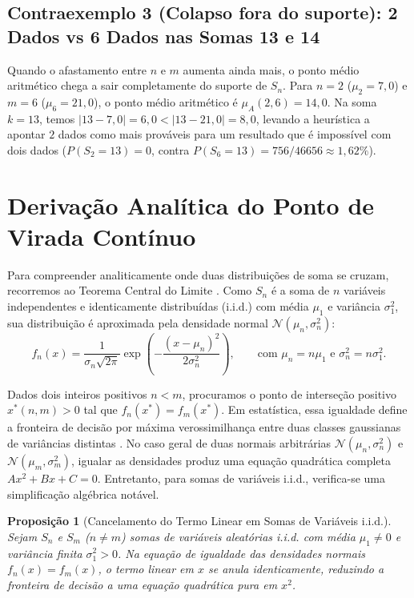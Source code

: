 \documentclass[11pt,a4paper]{article}
\newtheorem{proposition}[theorem]{Proposição}
\theoremstyle{definition}
\theoremstyle{remark}
\begin{document}
\subsection{Contraexemplo 3 (Colapso fora do suporte): 2 Dados vs 6 Dados nas Somas 13 e 14}

Quando o afastamento entre $n$ e $m$ aumenta ainda mais, o ponto médio aritmético chega a sair completamente do suporte de $S_n$. Para $n = 2$ ($\mu_2 = 7{,}0$) e $m = 6$ ($\mu_6 = 21{,}0$), o ponto médio aritmético é $\mu_A(2,6) = 14{,}0$. Na soma $k = 13$, temos $|13 - 7{,}0| = 6{,}0 < |13 - 21{,}0| = 8{,}0$, levando a heurística a apontar $2$ dados como mais prováveis para um resultado que é impossível com dois dados ($P(S_2 = 13) = 0$, contra $P(S_6 = 13) = 756/46656 \approx 1{,}62\%$).

\section{Derivação Analítica do Ponto de Virada Contínuo}
\label{sec:derivacao}

Para compreender analiticamente onde duas distribuições de soma se cruzam, recorremos ao Teorema Central do Limite \cite{feller1968,hogg2019}. Como $S_n$ é a soma de $n$ variáveis independentes e identicamente distribuídas (i.i.d.) com média $\mu_1$ e variância $\sigma_1^2$, sua distribuição é aproximada pela densidade normal $\mathcal{N}(\mu_n, \sigma_n^2)$:
\begin{equation}
f_n(x) = \frac{1}{\sigma_n \sqrt{2\pi}} \exp\!\left( -\frac{(x - \mu_n)^2}{2\sigma_n^2} \right),
\qquad \text{com } \mu_n = n\mu_1 \text{ e } \sigma_n^2 = n\sigma_1^2.
\label{eq:densidade_normal}
\end{equation}

Dados dois inteiros positivos $n < m$, procuramos o ponto de interseção positivo $x^*(n,m) > 0$ tal que $f_n(x^*) = f_m(x^*)$. Em estatística, essa igualdade define a fronteira de decisão por máxima verossimilhança entre duas classes gaussianas de variâncias distintas \cite{hogg2019}. No caso geral de duas normais arbitrárias $\mathcal{N}(\mu_n, \sigma_n^2)$ e $\mathcal{N}(\mu_m, \sigma_m^2)$, igualar as densidades produz uma equação quadrática completa $Ax^2 + Bx + C = 0$. Entretanto, para somas de variáveis i.i.d., verifica-se uma simplificação algébrica notável.

\begin{proposition}[Cancelamento do Termo Linear em Somas de Variáveis i.i.d.]
\label{prop:cancelamento}
Sejam $S_n$ e $S_m$ ($n \neq m$) somas de variáveis aleatórias i.i.d. com média $\mu_1 \neq 0$ e variância finita $\sigma_1^2 > 0$. Na equação de igualdade das densidades normais $f_n(x) = f_m(x)$, o termo linear em $x$ se anula identicamente, reduzindo a fronteira de decisão a uma equação quadrática pura em $x^2$.
\end{proposition}
\end{document}
